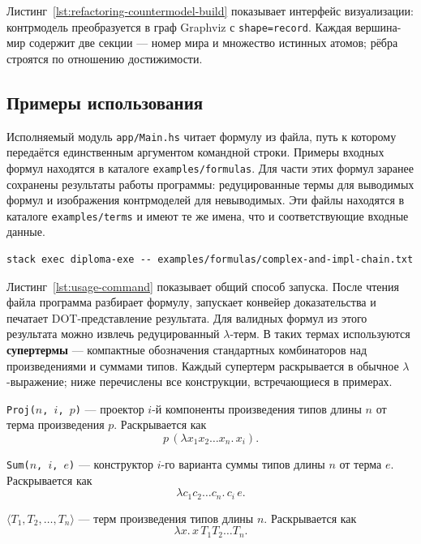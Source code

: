\documentclass[14pt, russian]{scrartcl}
\begin{document}
Листинг~\ref{lst:refactoring-countermodel-build} показывает интерфейс
визуализации: контрмодель преобразуется в граф Graphviz с \texttt{shape=record}.
Каждая вершина-мир содержит две секции --- номер мира и множество истинных
атомов; рёбра строятся по отношению достижимости.

\subsection{Примеры использования}

Исполняемый модуль \texttt{app/Main.hs} читает формулу из файла, путь к которому
передаётся единственным аргументом командной строки. Примеры входных формул
находятся в каталоге \texttt{examples/formulas}. Для части этих формул заранее
сохранены результаты работы программы: редуцированные термы для выводимых формул
и изображения контрмоделей для невыводимых. Эти файлы находятся в каталоге
\texttt{examples/terms} и имеют те же имена, что и соответствующие входные
данные.

\begin{listing}[!htb]
\caption{Запуск программы на файле с формулой}
\label{lst:usage-command}
\begin{verbatim}
stack exec diploma-exe -- examples/formulas/complex-and-impl-chain.txt
\end{verbatim}
\end{listing}

Листинг~\ref{lst:usage-command} показывает общий способ запуска. После чтения
файла программа разбирает формулу, запускает конвейер доказательства и печатает
DOT-представление результата. Для валидных формул из этого результата можно
извлечь редуцированный $\lambda$-терм. В таких термах используются
\textbf{супертермы} --- компактные обозначения стандартных комбинаторов над
произведениями и суммами типов. Каждый супертерм раскрывается в обычное
$\lambda$-выражение; ниже перечислены все конструкции, встречающиеся в
примерах.

\texttt{Proj($n$, $i$, $p$)} --- проектор $i$-й компоненты произведения
  типов длины $n$ от терма произведения $p$. Раскрывается как
  \[
    p\,(\lambda x_1 x_2 \ldots x_n.\, x_i).
  \]

\texttt{Sum($n$, $i$, $e$)} --- конструктор $i$-го варианта суммы типов
  длины $n$ от терма $e$. Раскрывается как
  \[
    \lambda c_1 c_2 \ldots c_n.\, c_i\, e.
  \]

$\langle T_1, T_2, \ldots, T_n \rangle$ --- терм произведения типов
  длины $n$. Раскрывается как
  \[
    \lambda x.\, x\, T_1 T_2 \ldots T_n.
  \]
\end{document}
